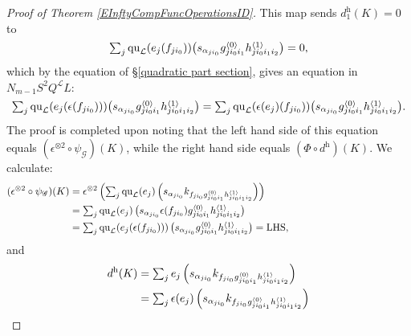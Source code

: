 \documentclass[11pt]{amsart} \renewcommand{\baselinestretch}{1.2}
\theoremstyle{plain}
\numberwithin{equation}{section} %
\theoremstyle{plain}
\numberwithin{equation}{chapter} %
\newcommand{\scrG}{\mathscr{G}}
\newcommand{\calL}{\mathcal{L}}
\newcommand{\call}{\mathcal{L}}
\newcommand{\BSW}{{\scrG}}
\newcommand{\quadratic}{\mathrm{qu}}
\newcommand{\Id}{\mathrm{id}}
\newcommand{\uhor}{^\mathrm{h}}
\begin{document}
\begin{Operations in composite functor spectral sequences}
\begin{proof}[Proof of Theorem \ref{EInftyCompFuncOperationsID}]
This map sends $d\uhor_1(K)=0$ to %
\[
\textstyle\sum_j {\quadratic_\call}(e_j(f_{ji_0}))\smash{\left(s_{\alpha_{ji_0}} {g^{\smash{\langle} 0\smash{\rangle}}_{ji_0i_1}h^{\smash{\langle} 1\smash{\rangle}}_{ji_0i_1i_2}}\right)}=0, \]
which by the equation of \S\ref{quadratic part section}, gives an equation in $N_{m-1}S^2Q^{\calL}L$:
\[\textstyle\sum_j {\quadratic_\call}(e_j(\epsilon (f_{ji_0})))\smash{\left(s_{\alpha_{ji_0}} {g^{\smash{\langle} 0\smash{\rangle}}_{ji_0i_1}h^{\smash{\langle} 1\smash{\rangle}}_{ji_0i_1i_2}}\right)}
=
\textstyle\sum_j {\quadratic_\call}(\epsilon (e_j)(f_{ji_0}))\smash{\left(s_{\alpha_{ji_0}} {g^{\smash{\langle} 0\smash{\rangle}}_{ji_0i_1}h^{\smash{\langle} 1\smash{\rangle}}_{ji_0i_1i_2}}\right)}.
\]
The proof is completed upon noting that the left hand side of this equation equals $(\epsilon^{\otimes 2}\circ \psi_\BSW)(K)$, while the right hand side equals $(\Phi\circ d\uhor)(K)$. We calculate:
\begin{alignat*}{2}
(\epsilon^{\otimes 2}\circ \psi_\BSW)(K)
&=
\epsilon^{\otimes 2}\left(\textstyle\sum_j {\quadratic_\call}(e_j)\left(s_{\alpha_{ji_0}} k_{f\relax _{ji_0}g^{\smash{\langle} 0\smash{\rangle}}_{ji_0i_1}h^{\smash{\langle} 1\smash{\rangle}}_{ji_0i_1i_2}}\right)\right)%
\\
&=
\textstyle\sum_j {\quadratic_\call}(e_j)\left(s_{\alpha_{ji_0}} \epsilon(f\relax _{ji_0})g^{\smash{\langle} 0\smash{\rangle}}_{ji_0i_1}h^{\smash{\langle} 1\smash{\rangle}}_{ji_0i_1i_2}\right)%
&\qquad&\text{\!\!\!\!\!\!\!\!\phantom{(relevant $s_{\alpha_{ji_0}}$ are $\Id$)}}
\\
&=
\textstyle\sum_j {\quadratic_\call}(e_j(\epsilon (f_{ji_0})))\left(s_{\alpha_{ji_0}} g^{\smash{\langle} 0\smash{\rangle}}_{ji_0i_1}h^{\smash{\langle} 1\smash{\rangle}}_{ji_0i_1i_2}\right)=\textup{LHS},
\end{alignat*}
and
\begin{alignat*}{2}
d\uhor(K)
&=
\textstyle\sum_j e_j\left(s_{\alpha_{ji_0}} k_{f\relax _{ji_0}g^{\smash{\langle} 0\smash{\rangle}}_{ji_0i_1}h^{\smash{\langle} 1\smash{\rangle}}_{ji_0i_1i_2}}\right)%
\\
&=
\textstyle\sum_j \epsilon (e_j)\left(s_{\alpha_{ji_0}} k_{f\relax _{ji_0}g^{\smash{\langle} 0\smash{\rangle}}_{ji_0i_1}h^{\smash{\langle} 1\smash{\rangle}}_{ji_0i_1i_2}}\right)%

\end{alignat*}
\end{proof}
\end{Operations in composite functor spectral sequences}
\end{document}
